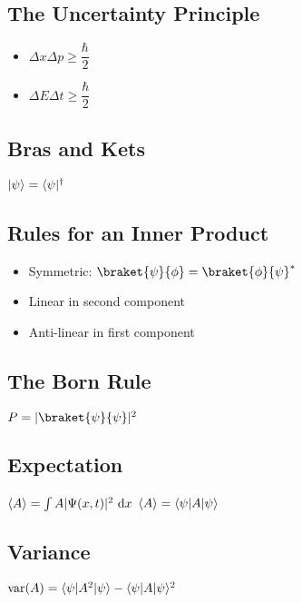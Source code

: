 \subsection{The Uncertainty Principle}
\begin{itemize}
\item \( \Delta x \Delta p \geq \dfrac{\hbar}{2} \)
\item \( \Delta E \Delta t \geq \dfrac{\hbar}{2} \)
\end{itemize}

\subsection{Bras and Kets}			
\begin{itemize}
\itemt \( \lvert\psi\rangle = \langle\psi\rvert^\dagger \)
\end{itemize}				

\subsection{Rules for an Inner Product}			

\begin{itemize}
\itemt \( \braket{\psi}{\phi} \equiv (\ket{\psi}, \ket{\phi}) \)
\item Symmetric:
\subitem \( \braket{\psi}{\phi} = \braket{\phi}{\psi}^* \)
\item Linear in second component
\item Anti-linear in first component
\end{itemize}				

\subsection{The Born Rule}
\begin{itemize}
\itemt \( P = |\braket{\psi}{\psi}|^2 \)
\end{itemize}

\subsection{Expectation}
\begin{itemize}
\itemt \( \langle A \rangle = \int A |\Psi(x,t)|^2 \ \mathrm{d}x \)
\itemt \( \langle A \rangle = \langle\psi\rvert A \lvert\psi\rangle \)
\end{itemize}	

\subsection{Variance}
\begin{itemize}
\itemt \( \mathrm{var}(A) = \langle\psi\rvert A^2 \lvert\psi\rangle - \langle\psi\rvert A \lvert\psi\rangle^2 \)
\end{itemize}	


